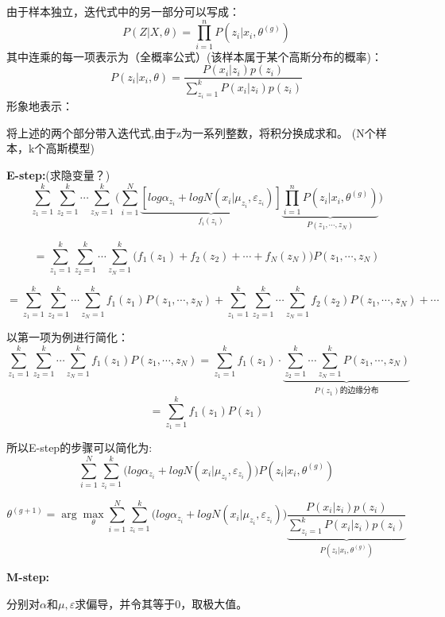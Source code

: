 \documentclass[UTF8]{ctexart} %
\begin{document}
			由于样本独立，迭代式中的另一部分可以写成：
			\[P(Z|X,\theta) = \prod_{i=1}^nP(z_i|x_i,\theta^{(g)})\]
			其中连乘的每一项表示为（全概率公式）(该样本属于某个高斯分布的概率)：
			\[P(z_i|x_i,\theta)  = \frac{P(x_i|z_i)p(z_i)}{\sum_{z_{i}=1}^kP(x_i|z_i)p(z_i)}\]
			形象地表示：
			\begin{figure}[H]
			\end{figure}		
			将上述的两个部分带入迭代式,由于z为一系列整数，将积分换成求和。
			(N个样本，k个高斯模型)
			
			\textbf{E-step:}(求隐变量？)
			\[\sum_{z_1=1}^k\sum_{z_2=1}^k\cdots\sum_{z_N=1}^k\bigg(\sum_{i=1}^N
			\underbrace{[log\alpha_{z_i}+logN(x_i|\mu_{z_i},\varepsilon_{z_i})]}_{f_i(z_i)}
			\underbrace{\prod_{i=1}^nP(z_i|x_i,\theta^{(g)})}_{P(z_1,\cdots,z_N)}\bigg)\]
			
			\[=\sum_{z_1=1}^k\sum_{z_2=1}^k\cdots\sum_{z_N=1}^k\Big(f_1(z_1)+f_2(z_2)+\cdots +f_N(z_N)\Big)P(z_1,\cdots,z_N)\]
			
			\[=\sum_{z_1=1}^k\sum_{z_2=1}^k\cdots\sum_{z_N=1}^kf_1(z_1)P(z_1,\cdots,z_N)+\sum_{z_1=1}^k\sum_{z_2=1}^k\cdots\sum_{z_N=1}^kf_2(z_2)P(z_1,\cdots,z_N)+\cdots\]
			
			以第一项为例进行简化：
			\[\sum_{z_1=1}^k\sum_{z_2=1}^k\cdots\sum_{z_N=1}^kf_1(z_1)P(z_1,\cdots,z_N) = \sum_{z_1=1}^kf_1(z_1)\cdot \underbrace{\sum_{z_2=1}^k\cdots\sum_{z_N=1}^kP(z_1,\cdots,z_N)}_{P(z_1)\text{的边缘分布}}\]
			\[=\sum_{z_1=1}^kf_1(z_1)P(z_1)\]
			
			所以E-step的步骤可以简化为: 
			\[\sum_{i=1}^N\sum_{z_i=1}^k\Big(log\alpha_{z_i}+logN(x_i|\mu_{z_i},\varepsilon_{z_i})\Big) P(z_i|x_i,\theta^{(g)})\]
			
			\[\theta^{(g+1)} =\arg\max_{\theta} \sum_{i=1}^N\sum_{z_i=1}^k\Big(log\alpha_{z_i}+logN(x_i|\mu_{z_i},\varepsilon_{z_i})\Big)\underbrace{\frac{P(x_i|z_i)p(z_i)}{\sum_{z_{i}=1}^kP(x_i|z_i)p(z_i)}}_{P(z_i|x_i,\theta^{(g)})}\]
			
			\textbf{M-step:}
			
			分别对$\alpha$和$\mu,\varepsilon$求偏导，并令其等于0，取极大值。
			
\end{document}
